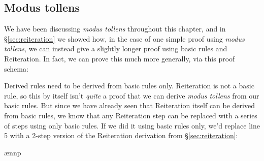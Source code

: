 



\subsection{Modus tollens}

We have been discussing \emph{modus tollens} throughout this chapter, and in \S\ref{sec:reiteration} we showed how, in the case of one simple proof using \emph{modus tollens}, we can instead give a slightly longer proof using basic rules and Reiteration. In fact, we can prove this much more generally, via this proof schema:

\begin{ndproof}
	 \want{\enot \metaB{}}
	\open
		 
	\close
\end{ndproof}

Derived rules need to be derived from basic rules only. Reiteration is not a basic rule, so this by itself isn't \emph{quite} a proof that we can derive \emph{modus tollens} from our basic rules. But since we have already seen that Reiteration itself can be derived from basic rules, we know that any Reiteration step can be replaced with a series of steps using only basic rules. If we did it using basic rules only, we'd replace line 5 with a 2-step version of the Reiteration derivation from \S\ref{sec:reiteration}:

\begin{ndproof}
	 \want{\enot \metaB{}}
	\open
		 
		\ae{nnp}		
	\close
\end{ndproof}

